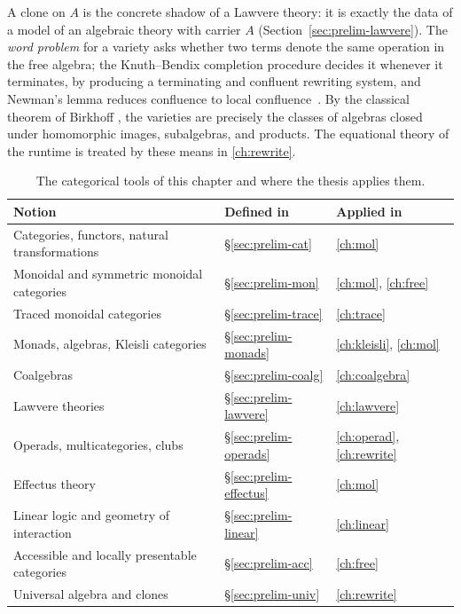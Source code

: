 \begin{remark}
A clone on $A$ is the concrete shadow of a Lawvere theory: it is exactly the
data of a model of an algebraic theory with carrier $A$
(Section~\ref{sec:prelim-lawvere}). The \emph{word problem} for a variety
asks whether two terms denote the same operation in the free algebra; the
Knuth--Bendix completion procedure decides it whenever it terminates, by
producing a terminating and confluent rewriting system, and Newman's lemma
reduces confluence to local confluence~\cite{knuthbendix, newman,
arxiv-rewriting-kb}. By the classical theorem of Birkhoff \citep{birkhoff}, the varieties are
precisely the classes of algebras closed under homomorphic images,
subalgebras, and products. The equational theory of the runtime is treated by
these means in \autoref{ch:rewrite}.
\end{remark}

\begin{table}[htbp]
\centering
\small
\begin{tabular}{@{}lll@{}}
\toprule
Notion & Defined in & Applied in \\
\midrule
Categories, functors, natural transformations & \S\ref{sec:prelim-cat} & \autoref{ch:mol} \\
Monoidal and symmetric monoidal categories & \S\ref{sec:prelim-mon} & \autoref{ch:mol}, \autoref{ch:free} \\
Traced monoidal categories & \S\ref{sec:prelim-trace} & \autoref{ch:trace} \\
Monads, algebras, Kleisli categories & \S\ref{sec:prelim-monads} & \autoref{ch:kleisli}, \autoref{ch:mol} \\
Coalgebras & \S\ref{sec:prelim-coalg} & \autoref{ch:coalgebra} \\
Lawvere theories & \S\ref{sec:prelim-lawvere} & \autoref{ch:lawvere} \\
Operads, multicategories, clubs & \S\ref{sec:prelim-operads} & \autoref{ch:operad}, \autoref{ch:rewrite} \\
Effectus theory & \S\ref{sec:prelim-effectus} & \autoref{ch:mol} \\
Linear logic and geometry of interaction & \S\ref{sec:prelim-linear} & \autoref{ch:linear} \\
Accessible and locally presentable categories & \S\ref{sec:prelim-acc} & \autoref{ch:free} \\
Universal algebra and clones & \S\ref{sec:prelim-univ} & \autoref{ch:rewrite} \\
\bottomrule
\end{tabular}
\caption{The categorical tools of this chapter and where the thesis applies them.}
\end{table}


